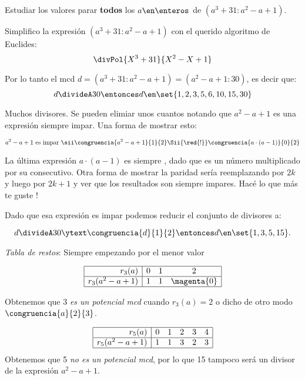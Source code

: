 \begin{enunciado}{\ejExtra}
  Estudiar los valores parar \textbf{todos} los $a \en \enteros$ de $(a^3 + 31 : a^2 - a + 1)$.\\
\end{enunciado}

Simplifico la expresión $(a^3 + 31 : a^2 - a + 1)$ con el querido algoritmo de Euclides:
$$
  \divPol{X^3 + 31}{X^2 - X+ 1}
$$

Por lo tanto el mcd $d = (a^3 + 31 : a^2 - a + 1) = (a^2-a+1: 30)$, es decir que:
$$
  d \divideA 30 \entonces d \en \set{1, 2, 3, 5, 6, 10, 15, 30}
$$

Muchos divisores. Se pueden elimiar unos cuantos notando que $a^2 - a + 1$ es una expresión siempre impar. Una forma de mostrar esto:

$$
  a^2 - a + 1 \text{ es impar }
  \sii
  \congruencia{a^2 - a + 1}{1}{2}
  \Sii{\red{!}}
  \congruencia{a \cdot (a - 1)}{0}{2}
$$

La última expresión $a \cdot (a-1)$ es siempre , dado que es un número multiplicado por su consecutivo.
{\tiny Otra forma de mostrar la paridad sería reemplazando
por $2k$ y luego por $2k+1$ y ver que los resultados son siempre impares. Hacé lo que más te guste !}\par\medskip

Dado que esa expresión es impar podemos reducir el conjunto de divisores a:

$$
  d \divideA 30 \ytext \congruencia{d}{1}{2} \entonces d \en \set{1,3,5,15}.
$$

\textit{Tabla de restos}: Siempre empezando por el menor valor

$$
  \begin{array}{|r|ccc|}
    \hline
    r_3(a)           & 0 & 1 & 2           \\ \hline
    r_3(a^2 - a + 1) & 1 & 1 & \magenta{0} \\ \hline
  \end{array}
$$

Obtenemos que 3 \textit{es un potencial mcd} cuando $r_3(a) = 2$ o dicho de otro modo $\congruencia{a}{2}{3}$.

$$
  \begin{array}{|r|ccccc|}
    \hline
    r_5(a)           & 0 & 1 & 2 & 3 & 4 \\ \hline
    r_5(a^2 - a + 1) & 1 & 1 & 3 & 2 & 3 \\ \hline
  \end{array}
$$
Obtenemos que 5 \textit{no es un potencial mcd}, por lo que 15 tampoco será un divisor de la expresión  $a^2 - a + 1$.


